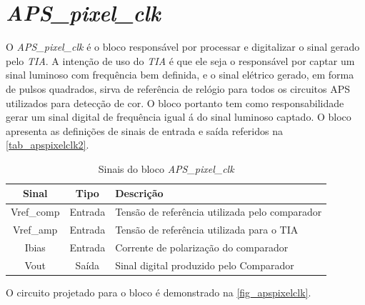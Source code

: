\renewcommand{\NomeBloco}{\emph{APS\_pixel\_clk}}
\renewcommand{\NomeBlocoNoUnderline}{apspixelclk}
\renewcommand{\NomePTab}{tab_\NomeBlocoNoUnderline}
\renewcommand{\NomeSTab}{tab_\NomeBlocoNoUnderline2}
\renewcommand{\NomePFig}{fig_\NomeBlocoNoUnderline}
\renewcommand{\NomeSFig}{fig_\NomeBlocoNoUnderline2}
\renewcommand{\NomeTTab}{tab_\NomeBlocoNoUnderline3}
\renewcommand{\NomeQTab}{tab_\NomeBlocoNoUnderline4}

\section{\NomeBloco}

O \NomeBloco{} \'e o bloco respons\'avel por processar e digitalizar o sinal gerado pelo \emph{TIA}. A inten{\c c}\~ao de uso do \emph{TIA} \'e que ele seja o respons\'avel por captar um sinal luminoso com frequ\^encia bem definida, e o sinal el\'etrico gerado, em forma de pulsos quadrados, sirva de refer\^encia de rel\'ogio para todos os circuitos APS utilizados para detec{\c c}\~ao de cor. O bloco portanto tem como responsabilidade gerar um sinal digital de frequ\^encia igual \'a do sinal luminoso captado. O bloco apresenta as defini{\c c}\~oes de sinais de entrada e sa\'ida referidos na \autoref{\NomeSTab}.

\begin{table}[htbp]
\caption{Sinais do bloco \NomeBloco}
\label{\NomeSTab}
\centering
\begin{tabular}{ccl}

    \toprule
    Sinal & Tipo    & Descri{\c c}\~ao\\
    \midrule \midrule
    Vref\_comp   & Entrada   & Tens\~ao de refer\^encia utilizada pelo comparador\\
    \midrule
    Vref\_amp   & Entrada   & Tens\~ao de refer\^encia utilizada para o TIA\\
    \midrule
    Ibias   & Entrada   & Corrente de polariza{\c c}\~ao do comparador \\
    \midrule
    Vout   & Saída   & Sinal digital produzido pelo Comparador\\
    \bottomrule
\end{tabular}
\end{table}

O circuito projetado para o bloco \'e demonstrado na \autoref{\NomePFig}.

